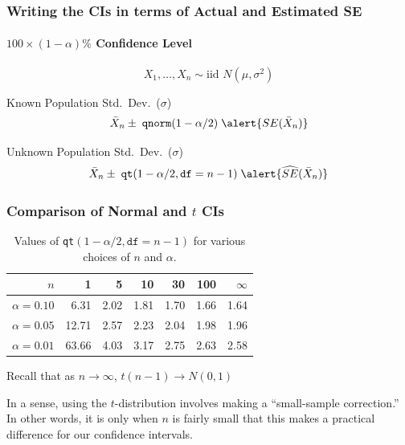 \documentclass{beamer}
\begin{document}
\begin{frame}
\frametitle{Writing the CIs in terms of Actual and Estimated SE}
\framesubtitle{$100\times(1-\alpha)\%$ Confidence Level}
$$\boxed{X_1, \hdots, X_n \sim \mbox{iid } N(\mu, \sigma^2)}$$

\begin{block}{Known Population Std.\ Dev.\ ($\sigma$)}
	$$\bar{X}_n \pm \; \texttt{qnorm}(1-\alpha/2) \; \alert{SE(\bar{X}_n)}$$
\end{block}

\begin{block}{Unknown Population Std.\ Dev.\ ($\sigma$)}
$$\bar{X}_n \pm \; \texttt{qt}(1-\alpha/2, \texttt{df} = n-1) \; \alert{\widehat{SE}(\bar{X}_n)}$$
\end{block}
\end{frame}

\begin{frame}
\frametitle{Comparison of Normal and $t$ CIs}
\begin{table}
\caption{Values of \texttt{qt}$(1-\alpha/2, \texttt{df}=n-1)$ for various choices of $n$ and $\alpha$. }
\begin{tabular}{r|rrrrr|r}
\hline
$n$& 1& 5& 10& 30& 100 & $\infty$\\
\hline
$\alpha = 0.10$&  6.31& 2.02 & 1.81 & 1.70  & 1.66 &1.64\\
$\alpha = 0.05$ & 12.71& 2.57 & 2.23 & 2.04  & 1.98 &1.96\\
$\alpha = 0.01$ & 63.66& 4.03 & 3.17 & 2.75  & 2.63 &2.58\\
\hline
\end{tabular}
\end{table}
\alert{Recall that as $n\rightarrow \infty$, $t(n-1) \rightarrow N(0,1)$}
\vspace{1em}


In a sense, using the $t$-distribution involves making a ``small-sample correction.'' In other words, it is only when $n$ is fairly small that this makes a practical difference for our confidence intervals.
\end{frame}
\end{document}
